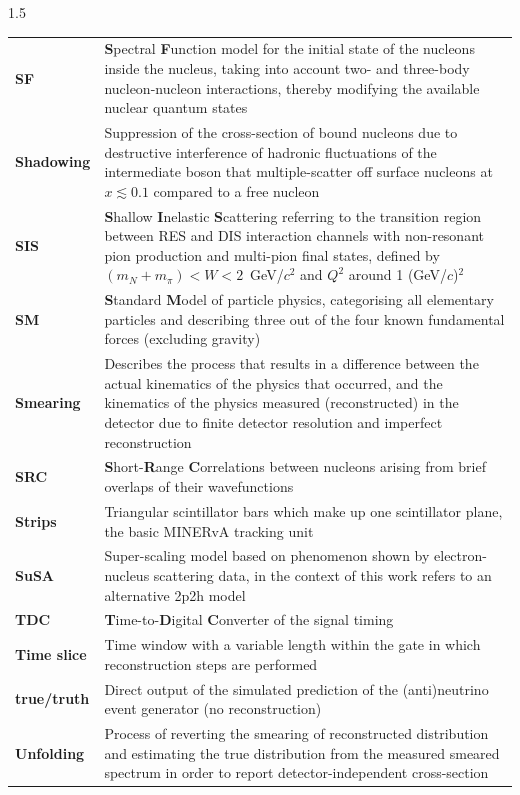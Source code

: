\begin{spacing}{1.5}
\begin{longtable}[l]{p{} p{}}
        \textbf{SF} & \textbf{S}pectral \textbf{F}unction model for the initial state of the nucleons inside the nucleus, taking into account two- and three-body nucleon-nucleon interactions, thereby modifying the available nuclear quantum states \\
        \textbf{Shadowing} & Suppression of the cross-section of bound nucleons due to destructive interference of hadronic fluctuations of the intermediate boson that multiple-scatter off surface nucleons at $x \lesssim 0.1$ compared to a free nucleon  \\
        \textbf{SIS} & \textbf{S}hallow \textbf{I}nelastic \textbf{S}cattering referring to the transition region between RES and DIS interaction channels with non-resonant pion production and multi-pion final states, defined by \mbox{$(m_N + m_{\pi}) < W < 2$ GeV/$c^2$} and $Q^2$ around 1 (GeV/$c$)$^2$ \\
        \textbf{SM} & \textbf{S}tandard \textbf{M}odel of particle physics, categorising all elementary particles and describing three out of the four known fundamental forces (excluding gravity)  \\
        \textbf{Smearing} & Describes the process that results in a difference between the actual kinematics of the physics that occurred, and the kinematics of the physics measured (reconstructed) in the detector due to finite detector resolution and imperfect reconstruction    \\
        \textbf{SRC} & \textbf{S}hort-\textbf{R}ange \textbf{C}orrelations between nucleons arising from brief overlaps of their wavefunctions  \\
        \textbf{Strips} & Triangular scintillator bars which make up one scintillator plane, the basic MINERvA tracking unit  \\
        \textbf{SuSA} & Super-scaling model based on phenomenon shown by electron-nucleus scattering data, in the context of this work refers to an alternative 2p2h model \\
        \textbf{TDC} & \textbf{T}ime-to-\textbf{D}igital \textbf{C}onverter of the signal timing  \\
        \textbf{Time slice} & Time window with a variable length within the gate in which reconstruction steps are performed  \\
        \textbf{true/truth} & Direct output of the simulated prediction of the (anti)neutrino event generator (no reconstruction) \\
        \textbf{Unfolding} & Process of reverting the smearing of reconstructed distribution and estimating the true distribution from the measured smeared spectrum in order to report detector-independent cross-section  \\

\end{longtable}
\end{spacing}
